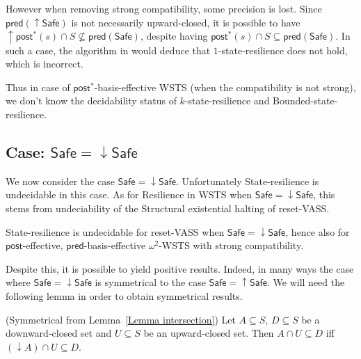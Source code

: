 \documentclass[runningheads]{llncs}
\newcommand{\mathieu}[1]{\todo[inline,color=blue!20]{{\bf MH:} #1}}
\newcommand{\pred}{\textsf{pred}}
\newcommand{\post}{\textsf{post}}
\newcommand{\Safe}{\textsf{Safe}}
\begin{document}
However when removing strong compatibility, some precision is lost.
Since $\pred(\mathop{\uparrow} \Safe)$ is not necessarily upward-closed, it is possible to have 
 $\mathop{\uparrow} \post^* (s) \cap S \not\subseteq \pred(\Safe)$,
despite having 
$\post^* (s) \cap S \subseteq \pred( \Safe)$.
In such a case, the algorithm in
\cite{DBLP:conf/gg/Ozkan22} would deduce that {\sc $1$-state-resilience} does not hold,
which is incorrect.

Thus in case of $\post^*$-basis-effective WSTS (when the compatibility is not strong), we don't know the decidability status of {\sc $k$-state-resilience} and 
{\sc Bounded-state-resilience}. 





\subsection{Case: $\Safe = \mathop{\downarrow} \Safe$}


We now consider the case $\Safe = \mathop{\downarrow} \Safe$.
%
Unfortunately {\sc State-resilience} is undecidable in this case. As for {\sc Resilience} in WSTS when $\Safe = \mathop{\downarrow} \Safe$, this stems from undeciability of the 
{\sc Structural existential halting} of reset-VASS.

\begin{proposition}\label{srp down up}
{\sc State-resilience} is undecidable for reset-VASS when
$\Safe=\mathop{\downarrow} \Safe$, hence also for
$\post$-effective,
 $\pred$-basis-effective $\omega^2$-WSTS with strong compatibility.
 \end{proposition}



Despite this, it is possible to yield positive results. Indeed, in many ways the case where $\Safe = \mathop{\downarrow} \Safe$
is symmetrical to the case $\Safe = \mathop{\uparrow} \Safe$.
%
We will need the following lemma in order to obtain symmetrical results.

\begin{lemma}(Symmetrical from Lemma~\ref{Lemma intersection})\label{Lemma intersection 2}
Let $A \subseteq S$, $D \subseteq S$ be a downward-closed set and $U \subseteq S$ be an upward-closed set. 
Then $A \cap U \subseteq D$  iff $ (\mathop{\downarrow}  A) \cap U \subseteq D$.
\end{lemma}
\end{document}
